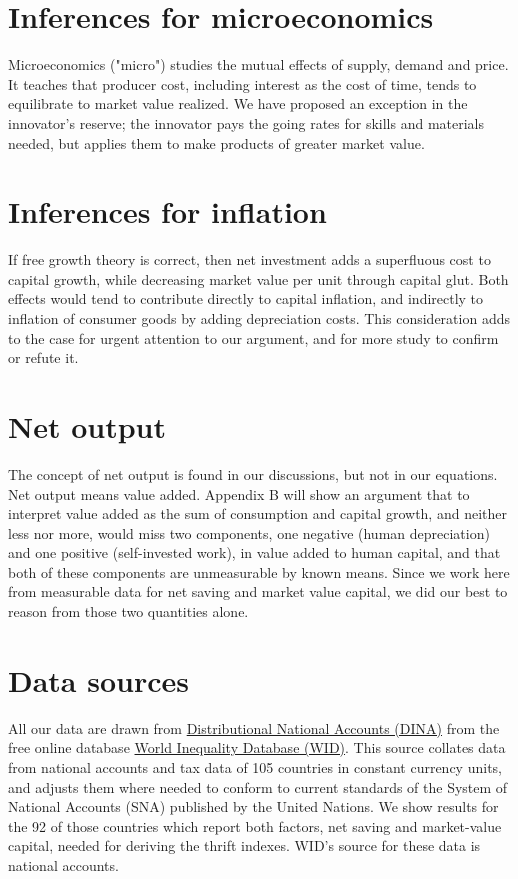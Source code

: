 \documentclass[a4paper,fleqn]{latex_styles/cas-sc}
\begin{document}
\section{Inferences for microeconomics}

Microeconomics ("micro") studies the mutual effects of supply, demand and price. It teaches that producer cost, including interest as the cost of time, tends to equilibrate to market value realized. We have proposed an exception in the innovator's reserve; the innovator pays the going rates for skills and materials needed, but applies them to make products of greater market value.

\section{Inferences for inflation}

If free growth theory is correct, then net investment adds a superfluous cost to capital growth, while decreasing market value per unit through capital glut. Both effects would tend to contribute directly to capital inflation, and indirectly to inflation of consumer goods by adding depreciation costs. This consideration adds to the case for urgent attention to our argument, and for more study to confirm or refute it.

\hypertarget{net-output}{
\section{Net output}\label{net-output}
}
The concept of net output is found in our discussions, but not in our equations. Net output means value added. Appendix B will show an argument that to interpret value added as the sum of consumption and capital growth, and neither less nor more, would miss two components, one negative (human depreciation) and one positive (self-invested work), in value added to human capital, and that both of these components are unmeasurable by known means. Since we work here from measurable data for net saving and market value capital, we did our best to reason from those two quantities alone.
%



\hypertarget{data-sources}{%
\section{Data sources}\label{data-sources}}

All our data are drawn from \href{https://wid.world/document/distributional-national-accounts-guidelines-2020-concepts-and-methods-used-in-the-world-inequality-database/}{Distributional National Accounts (DINA)} from the free online database \href{wid.world.com}{World
Inequality Database (WID)}. This source collates data from national accounts and tax data
of 105 countries in constant currency units, and adjusts them where needed to conform to current standards of the System of National Accounts
(SNA) published by the United Nations. We show results for the 92 of
those countries which report both factors, net
saving and market-value capital, needed for deriving
the thrift indexes. WID's source for these data is national accounts.
\end{document}
